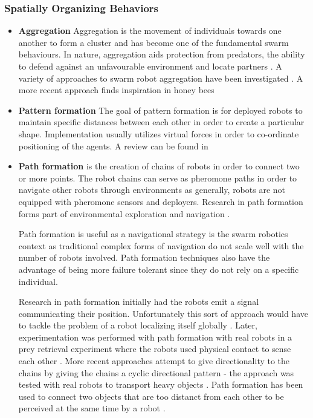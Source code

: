 \subsubsection{Spatially Organizing Behaviors}

\begin{itemize}
	\item \textbf{Aggregation} Aggregation is the movement of individuals towards one another to form a cluster and has become one of the fundamental swarm behaviours. In nature, aggregation aids protection from predators, the ability to defend against an unfavourable environment and locate partners \cite{bonabeau2001self}. A variety of approaches to swarm robot aggregation have been investigated \cite{yan2011algorithm, soysal2007aggregation, trianni2003evolving, dimarogonas2008connectedness }. A more recent approach finds inspiration in honey bees \cite{schmickl2011beeclust, schmickl2009two}
	
	\item \textbf{Pattern formation}
	The goal of pattern formation is for deployed robots to maintain specific distances between each other in order to create a particular shape. Implementation usually utilizes virtual forces in order to co-ordinate positioning of the agents. A review can be found in \cite{bahceci2003review, hettiarachchi2009review}
	
	\item \textbf{Path formation} is the creation of chains of robots in order to connect two or more points. The robot chains can serve as pheromone paths in order to navigate other robots through environments as generally, robots are not equipped with pheromone sensors and deployers. Research in path formation forms part of environmental exploration and navigation \cite{nouyan2006chain}. 
	
	Path formation is useful as a navigational strategy is the swarm robotics context as traditional complex forms of navigation do not scale well with the number of robots involved. Path formation techniques also have the advantage of being more failure tolerant since they do not rely on a specific individual.
	
	Research in path formation initially had the robots emit a signal communicating their position. Unfortunately this sort of approach would have to tackle the problem of a robot localizing itself globally \cite{goss1992harvesting}. Later, experimentation was performed with path formation with real robots in a prey retrieval experiment where the robots used physical contact to sense each other \cite{werger1996robotic}. More recent approaches attempt to give directionality to the chains by giving the chains a cyclic directional pattern - the approach was tested with real robots to transport heavy objects \cite{nouyan2006group}. Path formation has been used to connect two objects that are too distanct from each other to be perceived at the same time by a robot \cite{nouyan2006chain}.


\end{itemize}
